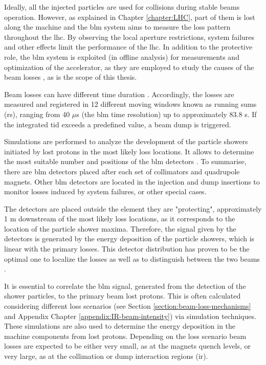 \documentclass[encoding=utf8,british]{tumphthesis}
\begin{document}
Ideally, all the injected particles are used for collisions during stable beams operation. However, as explained in Chapter \ref{chapter:LHC}, part of them is lost along the machine and the \acrshort{blm} system aims to measure the loss pattern throughout the \acrshort{lhc}. By observing the local aperture restrictions, system failures and other effects limit the performance of the \acrshort{lhc}. In addition to the protective role, the \acrshort{blm} system is exploited (in offline analysis) for measurements and optimization of the accelerator, as they are employed to study the causes of the beam losses \cite{Kacper-Stein-paper, Bilko:2692574}, as is the scope of this thesis.

Beam losses can have different time duration \cite{thesis-Sara-Morales}. Accordingly, the losses are measured and registered in 12 different moving windows known as running sums (\acrshort{rs}), ranging from 40 $\mu$s (the \acrshort{blm} time resolution) up to approximately 83.8 s. If the integrated \acrshort{tid} exceeds a predefined value, a beam dump is triggered.

Simulations are performed to analyze the development of the particle showers initiated by lost protons in the most likely loss locations. It allows to determine the most suitable number and positions of the \acrshort{blm} detectors \cite{Gschwendtner:2002vf}. To summarise, there are \acrshort{blm} detectors placed after each set of collimators and quadrupole magnets. Other \acrshort{blm} detectors are located in the injection and dump insertions to monitor losses induced by system failures, or other special cases.

The detectors are placed outside the element they are "protecting", approximately 1 m downstream of the most likely loss locations, as it corresponds to the location of the particle shower maxima. Therefore, the signal given by the detectors is generated by the energy deposition of the particle showers, which is linear with the primary losses. This detector distribution has proven to be the optimal one to localize the losses as well as to distinguish between the two beams \cite{Gschwendtner:2002vf}. 

It is essential to correlate the \acrshort{blm} signal, generated from the detection of the shower particles, to the primary beam lost protons. This is often calculated considering different loss scenarios (see Section \ref{section:beam-loss-mechanisms} and Appendix Chapter \ref{appendix:IR-beam-intensity}) via simulation techniques. These simulations are also used to determine the energy deposition in the machine components from lost protons. Depending on the loss scenario beam losses are expected to be either very small, as at the magnets quench levels, or very large, as at the collimation or dump interaction regions (\acrshort{ir}). 
\end{document}
